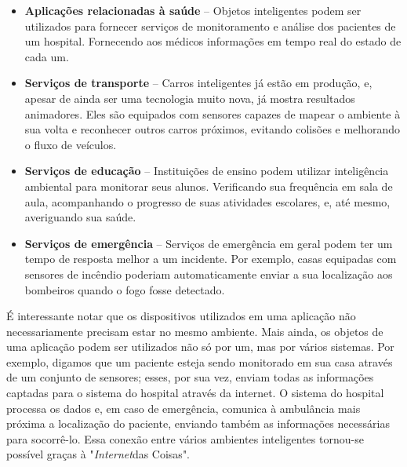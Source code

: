     \begin{itemize}
        \item \textbf{Aplicações relacionadas à saúde} -- Objetos inteligentes podem ser utilizados para fornecer serviços de monitoramento e análise dos pacientes de um hospital. Fornecendo aos médicos informações em tempo real do estado de cada um. 
        
        \item \textbf{Serviços de transporte} -- Carros inteligentes já estão em produção, e, apesar de ainda ser uma tecnologia muito nova, já mostra resultados animadores. Eles são equipados com sensores capazes de mapear o ambiente à sua volta e reconhecer outros carros próximos, evitando colisões e melhorando o fluxo de veículos. 
        
        \item \textbf{Serviços de educação} -- Instituições de ensino podem utilizar inteligência ambiental para monitorar seus alunos. Verificando sua frequência em sala de aula, acompanhando o progresso de suas atividades escolares, e, até mesmo, averiguando sua saúde.
        
        \item \textbf{Serviços de emergência} -- Serviços de emergência em geral podem ter um tempo de resposta melhor a um incidente. Por exemplo, casas equipadas com sensores de incêndio poderiam automaticamente enviar a sua localização aos bombeiros quando o fogo fosse detectado.
        
    \end{itemize}
    
    É interessante notar que os dispositivos utilizados em uma aplicação não necessariamente precisam estar no mesmo ambiente. Mais ainda, os objetos de uma aplicação podem ser utilizados não só por um, mas por vários sistemas. Por exemplo, digamos que um paciente esteja sendo monitorado em sua casa através de um conjunto de sensores; esses, por sua vez, enviam todas as informações captadas para o sistema do hospital através da internet. O sistema do hospital processa os dados  e, em caso de emergência, comunica à ambulância mais próxima a localização do paciente, enviando também as informações necessárias para socorrê-lo. Essa conexão entre vários ambientes inteligentes tornou-se possível graças à "\textit{Internet}das Coisas".
  

